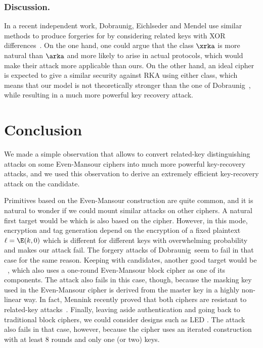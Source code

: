 \subsubsection{Discussion.}

In a recent independent work, Dobraunig, Eichlseder and Mendel use similar methods to produce forgeries for \proestotr by considering
related keys with XOR differences~\cite{DEM15}. On the one hand, one could argue that the class $\xrka$ is more natural than $\arka$
and more likely to arise in actual protocols, which would
make their attack more applicable than ours. On the other hand, an ideal cipher is expected to give a similar security against
RKA using either class, which means that our model is not theoretically stronger than the one of Dobraunig~\etal, while resulting in a
much more powerful key recovery attack.

\section{Conclusion}

We made a simple observation that allows to convert related-key distinguishing attacks on some Even-Mansour ciphers into much more
powerful key-recovery attacks, and we used this observation to derive an extremely efficient key-recovery attack on the
\proestotr \caesar candidate.

Primitives based on the Even-Mansour construction are quite common, and it is natural to wonder if we could mount similar
attacks on other ciphers. A natural first target would be \proestcopa which is also based on the \proestem cipher.
However, in this mode,
encryption and tag generation depend on the encryption of a fixed plaintext $\ell = \E(k, 0)$ which is different
for different keys with overwhelming probability and makes our attack fail. The forgery attacks of
Dobraunig~\etal seem to fail in that case for the same reason.
Keeping with \caesar candidates, another good target would be \minalpher~\cite{minalpher}, which also
uses a one-round Even-Mansour block cipher as one of its components. The attack also fails in this
case, though, because the masking key used in the Even-Mansour cipher is derived from the master key
in a highly non-linear way. In fact, Mennink recently proved that both ciphers are resistant
to related-key attacks~\cite{DBLP:journals/iacr/Mennink15a}.
Finally, leaving aside authentication and
going back to traditional block ciphers, we could consider designs such as LED \cite{LED}. The attack
also fails in that case, however, because the cipher uses an iterated construction with at least 8 rounds and
only one (or two) keys.

